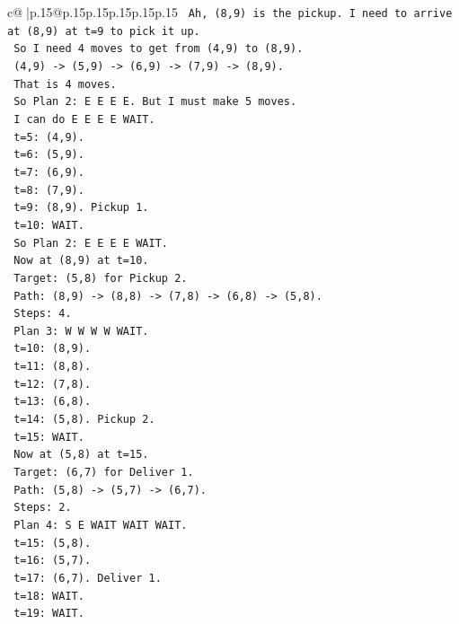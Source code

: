 \documentclass{article}
\begin{document}
{\begin{supertabular}{c@{$\;$}|p{.15\linewidth}@{}p{.15\linewidth}p{.15\linewidth}p{.15\linewidth}p{.15\linewidth}p{.15\linewidth}}
{{{\texttt{   Ah, (8,9) is the pickup. I need to arrive at (8,9) at t=9 to pick it up.} \\
\texttt{   So I need 4 moves to get from (4,9) to (8,9).} \\
\texttt{   (4,9) {-}> (5,9) {-}> (6,9) {-}> (7,9) {-}> (8,9).} \\
\texttt{   That is 4 moves.} \\
\texttt{   So Plan 2: E E E E. But I must make 5 moves.} \\
\texttt{   I can do E E E E WAIT.} \\
\texttt{   t=5: (4,9).} \\
\texttt{   t=6: (5,9).} \\
\texttt{   t=7: (6,9).} \\
\texttt{   t=8: (7,9).} \\
\texttt{   t=9: (8,9). Pickup 1.} \\
\texttt{   t=10: WAIT.} \\
\texttt{   So Plan 2: E E E E WAIT.} \\
\texttt{   Now at (8,9) at t=10.} \\
\texttt{   Target: (5,8) for Pickup 2.} \\
\texttt{   Path: (8,9) {-}> (8,8) {-}> (7,8) {-}> (6,8) {-}> (5,8).} \\
\texttt{   Steps: 4.} \\
\texttt{   Plan 3: W W W W WAIT.} \\
\texttt{   t=10: (8,9).} \\
\texttt{   t=11: (8,8).} \\
\texttt{   t=12: (7,8).} \\
\texttt{   t=13: (6,8).} \\
\texttt{   t=14: (5,8). Pickup 2.} \\
\texttt{   t=15: WAIT.} \\
\texttt{   Now at (5,8) at t=15.} \\
\texttt{   Target: (6,7) for Deliver 1.} \\
\texttt{   Path: (5,8) {-}> (5,7) {-}> (6,7).} \\
\texttt{   Steps: 2.} \\
\texttt{   Plan 4: S E WAIT WAIT WAIT.} \\
\texttt{   t=15: (5,8).} \\
\texttt{   t=16: (5,7).} \\
\texttt{   t=17: (6,7). Deliver 1.} \\
\texttt{   t=18: WAIT.} \\
\texttt{   t=19: WAIT.} \\
}}}
\end{supertabular}}
\end{document}
